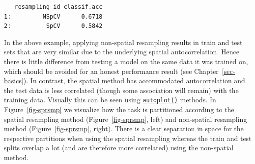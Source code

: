 \begin{Shaded}
\begin{Highlighting}[]
\OtherTok{=} \NormalTok{(}\NormalTok{, } \NormalTok{)}
\OtherTok{=} \NormalTok{(}\NormalTok{, } \NormalTok{, } \NormalTok{, } \NormalTok{)}
\OtherTok{=} \NormalTok{(}\NormalTok{, } \NormalTok{, } \NormalTok{,}
   \NormalTok{)}

\OtherTok{=} 
\OtherTok{=} 
\SpecialCharTok{$}\NormalTok{(}\NormalTok{(}\NormalTok{))[, }\NormalTok{(}\NormalTok{, }\NormalTok{)]}
\end{Highlighting}
\end{Shaded}

\begin{verbatim}
   resampling_id classif.acc
1:         NSpCV      0.6718
2:          SpCV      0.5842
\end{verbatim}

In the above example, applying non-spatial resampling results in train
and test sets that are very similar due to the underlying spatial
autocorrelation. Hence there is little difference from testing a model
on the same data it was trained on, which should be avoided for an
honest performance result (see Chapter~\ref{sec-basics}). In contrast,
the spatial method has accommodated autocorrelation and the test data is
less correlated (though some association will remain) with the training
data. Visually this can be seen using
\href{https://mlr3spatiotempcv.mlr-org.com/reference/autoplot.html}{\texttt{autoplot()}}
methods. In Figure~\ref{fig-sprsmp} we visualize how the task is
partitioned according to the spatial resampling method
(Figure~\ref{fig-sprsmp}, left) and non-spatial resampling method
(Figure~\ref{fig-sprsmp}, right). There is a clear separation in space
for the respective partitions when using the spatial resampling whereas
the train and test splits overlap a lot (and are therefore more
correlated) using the non-spatial method.

